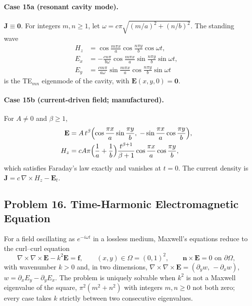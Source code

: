\documentclass[11pt]{article}
\begin{document}
\paragraph{Case 15a (resonant cavity mode).}
$\mathbf{J}\equiv\mathbf{0}$. For integers $m,n\ge1$, let
$\omega=c\pi\sqrt{(m/a)^2+(n/b)^2}$. The standing wave
\[
\begin{aligned}
H_z&=\cos\frac{m\pi x}{a}\cos\frac{n\pi y}{b}\cos\omega t,\\
E_x&=-\frac{cn\pi}{b\omega}\cos\frac{m\pi x}{a}\sin\frac{n\pi y}{b}\sin\omega t,\\
E_y&=\frac{cm\pi}{a\omega}\sin\frac{m\pi x}{a}\cos\frac{n\pi y}{b}\sin\omega t
\end{aligned}
\]
is the TE$_{mn}$ eigenmode of the cavity, with $\mathbf{E}(x,y,0)=\mathbf{0}$.

\paragraph{Case 15b (current-driven field; manufactured).}
For $A\neq0$ and $\beta\ge1$,
\[
\begin{aligned}
\mathbf{E}&=A\,t^\beta\Bigl(\cos\frac{\pi x}{a}\sin\frac{\pi y}{b},\;
-\sin\frac{\pi x}{a}\cos\frac{\pi y}{b}\Bigr),\\
H_z&=cA\pi\Bigl(\frac1a+\frac1b\Bigr)\frac{t^{\beta+1}}{\beta+1}
\cos\frac{\pi x}{a}\cos\frac{\pi y}{b},
\end{aligned}
\]
which satisfies Faraday's law exactly and vanishes at $t=0$. The current
density is $\mathbf{J}=c\,\nabla\times H_z-\mathbf{E}_t$.

\subsection*{Problem 16. Time-Harmonic Electromagnetic Equation}

For a field oscillating as $e^{-i\omega t}$ in a lossless medium, Maxwell's
equations reduce to the curl--curl equation \cite{Mon03}
\[
\boxed{\nabla\times\nabla\times\mathbf{E}-k^2\mathbf{E}=\mathbf{f}},
\qquad (x,y)\in\Omega=(0,1)^2,
\qquad \mathbf{n}\times\mathbf{E}=0 \text{ on } \partial\Omega,
\]
with wavenumber $k>0$ and, in two dimensions,
$\nabla\times\nabla\times\mathbf{E}=(\partial_yw,\,-\partial_xw)$,
$w=\partial_xE_y-\partial_yE_x$. The problem is uniquely solvable when
$k^2$ is not a Maxwell eigenvalue of the square, $\pi^2(m^2+n^2)$ with
integers $m,n\ge0$ not both zero; every case takes $k$ strictly between two
consecutive eigenvalues.
\end{document}
